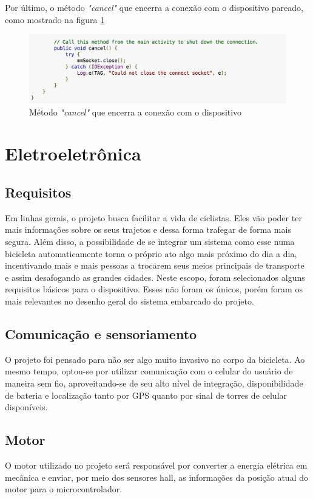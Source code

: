 Por último, o método \textit{"cancel"} que encerra a conexão com o dispositivo pareado, como mostrado na figura \ref{img:trecho5}

\graphicspath{{figuras/}}
  \begin{figure}[!htb]
  \centering
  \includegraphics[scale=0.80]{cancel_method}
  \caption{Método \textit{"cancel"} que encerra a conexão com o dispositivo}
  \label{img:trecho5}
  \end{figure}  
  
  \section{Eletroeletrônica}
	
	\subsection{Requisitos}
	Em linhas gerais, o projeto busca facilitar a vida de ciclistas. Eles vão poder ter mais informações sobre os seus trajetos e dessa forma trafegar de forma mais segura. Além disso, a possibilidade de se integrar um sistema como esse numa bicicleta automaticamente torna o próprio ato algo mais próximo do dia a dia, incentivando mais e mais pessoas a trocarem seus meios principais de transporte e assim desafogando as grandes cidades. 
	Neste escopo, foram selecionados alguns requisitos básicos para o dispositivo. Esses não foram os únicos, porém foram os mais relevantes no desenho geral do sistema embarcado do projeto.
	
	\subsection{Comunicação e sensoriamento}
	O projeto foi pensado para não ser algo muito invasivo no corpo da bicicleta. Ao mesmo tempo,  optou-se por utilizar comunicação com o celular do usuário de maneira sem fio, aproveitando-se de seu alto nível de integração, disponibilidade de bateria e localização tanto por GPS quanto por sinal de torres de celular disponíveis.
	
	\subsection{Motor}
	O motor utilizado no projeto será responsável por converter a energia elétrica em mecânica e enviar, por meio dos sensores hall, as informações da posição atual do motor para o microcontrolador.
	
